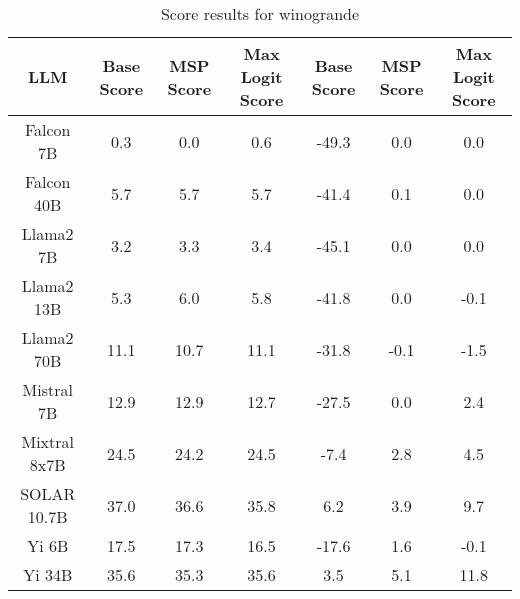\renewcommand\arraystretch{1.2}
\begin{table*}
\centering
\begin{tabular}{c|c|c|c|c|c|c}
LLM & Base Score & MSP Score & Max Logit Score & Base Score & MSP Score & Max Logit Score\\ \hline
Falcon 7B & 0.3 & 0.0 & 0.6 & -49.3 & 0.0 & 0.0\\
Falcon 40B & 5.7 & 5.7 & 5.7 & -41.4 & 0.1 & 0.0\\
Llama2 7B & 3.2 & 3.3 & 3.4 & -45.1 & 0.0 & 0.0\\
Llama2 13B & 5.3 & 6.0 & 5.8 & -41.8 & 0.0 & -0.1\\
Llama2 70B & 11.1 & 10.7 & 11.1 & -31.8 & -0.1 & -1.5\\
Mistral 7B & 12.9 & 12.9 & 12.7 & -27.5 & 0.0 & 2.4\\
Mixtral 8x7B & 24.5 & 24.2 & 24.5 & -7.4 & 2.8 & 4.5\\
SOLAR 10.7B & 37.0 & 36.6 & 35.8 & 6.2 & 3.9 & 9.7\\
Yi 6B & 17.5 & 17.3 & 16.5 & -17.6 & 1.6 & -0.1\\
Yi 34B & 35.6 & 35.3 & 35.6 & 3.5 & 5.1 & 11.8\\
\hline
\end{tabular}
\caption{Score results for winogrande}
\end{table*}
\label{tab:winogrande_score}
